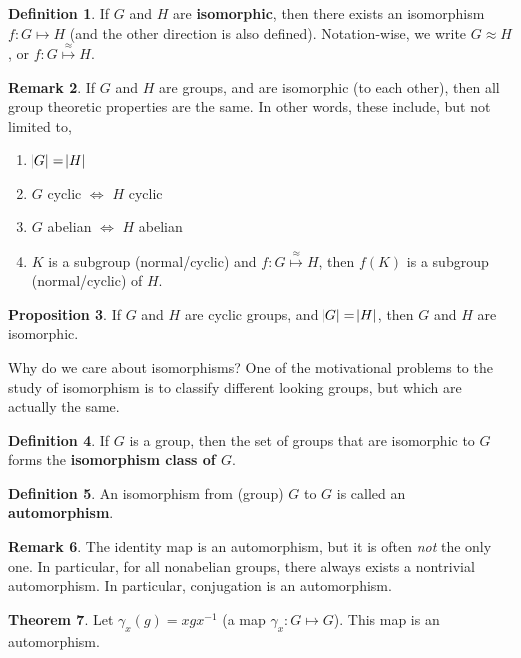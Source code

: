 \documentclass[11pt]{amsart} %
\theoremstyle{definition}
\newtheorem{definition}{Definition}[section]
\newtheorem{proposition}[definition]{Proposition}
\newtheorem{theorem}[definition]{Theorem}
\theoremstyle{definition}
\newtheorem{remark}[definition]{Remark}
\numberwithin{equation}{section}
\begin{document}
\begin{definition}
	If $G$ and $H$ are \textbf{isomorphic}, then there exists an isomorphism $f: G \mapsto H$ (and the other direction is also defined). Notation-wise, we write $G \approx H$, or $f: G \overset{\approx}{\longmapsto} H $.
\end{definition}

\begin{remark}
	If $G$ and $H$ are groups, and are isomorphic (to each other), then all group theoretic properties are the same. In other words, these include, but not limited to,
	\begin{enumerate}[noitemsep]
		\item $\abs{G} = \abs{H}$
		\item $G$ cyclic $\iff$ $H$ cyclic
		\item $G$ abelian $\iff$ $H$ abelian
		\item $K$ is a subgroup (normal/cyclic) and $f: G \overset{\approx}{\longmapsto} H $, then $f(K)$ is a subgroup (normal/cyclic) of $H$.
	\end{enumerate}
\end{remark}

\begin{proposition}
	If $G$ and $H$ are cyclic groups, and $\abs{G} = \abs{H}$, then $G$ and $H$ are isomorphic.
\end{proposition}

Why do we care about isomorphisms? One of the motivational problems to the study of isomorphism is to classify different looking groups, but which are actually the same.

\begin{definition}
	If $G$ is a group, then the set of groups that are isomorphic to $G$ forms the \textbf{isomorphism class of $G$}.
\end{definition}

\begin{definition}
	An isomorphism from (group) $G$ to $G$ is called an \textbf{automorphism}.
\end{definition}

\begin{remark}
	The identity map is an automorphism, but it is often \textit{not} the only one. In particular, for all nonabelian groups, there always exists a nontrivial automorphism. In particular, conjugation is an automorphism.
\end{remark}

\begin{theorem}
	\label{thmconjugacyisautomorphism}
	Let $\gamma_x (g) = xgx^{-1}$ (a map $\gamma_x : G \mapsto G$). This map is an automorphism.
\end{theorem}
\end{document}

